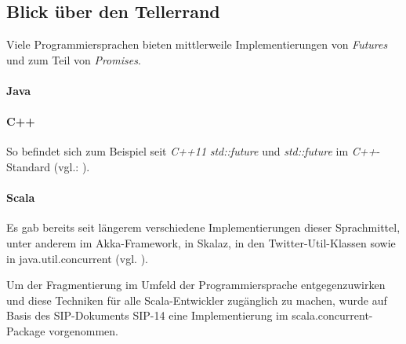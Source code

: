 \subsection{Blick über den Tellerrand}


Viele Programmiersprachen bieten mittlerweile Implementierungen von
\emph{Futures} und zum Teil von \emph{Promises}.

\paragraph{Java}

\paragraph{C++} So befindet sich zum Beispiel seit \emph{C++11} \emph{std::future} und
\emph{std::future} im \emph{C++}-Standard (vgl.: \cite{cpp11FAQ}).

\paragraph{Scala} Es gab bereits seit längerem verschiedene 
Implementierungen dieser Sprachmittel,
unter anderem im Akka-Framework, in Skalaz, in den Twitter-Util-Klassen sowie
in java.util.concurrent (vgl. \cite{futuresTry}).

Um der Fragmentierung im Umfeld der Programmiersprache entgegenzuwirken und
diese Techniken für alle Scala-Entwickler zugänglich zu machen, wurde auf Basis
des SIP-Dokuments SIP-14 eine Implementierung im scala.concurrent-Package
vorgenommen.

